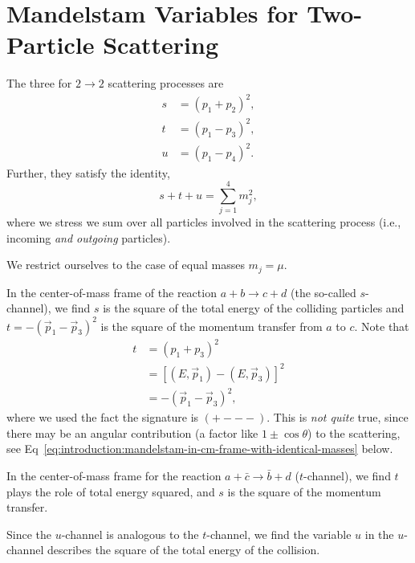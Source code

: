 \section{Mandelstam Variables for Two-Particle Scattering}

\begin{definition}
  The three  for $2\to2$ scattering
  processes are
  \begin{subequations}
    \begin{align}
      s &= (p_{1} + p_{2})^{2},\\
      t &= (p_{1} - p_{3})^{2},\\
      u &= (p_{1} - p_{4})^{2}.
    \end{align}
  \end{subequations}
  Further, they satisfy the identity,
  \begin{equation}
s + t + u = \sum^{4}_{j=1}m_{j}^{2},
  \end{equation}
  where we stress we sum over all particles involved in the scattering
  process (i.e., incoming \emph{and outgoing} particles).
\end{definition}

 We restrict ourselves to the case of equal masses
$m_{j}=\mu$.

 In the center-of-mass frame of the reaction $a+b\to c+d$
(the so-called $s$-channel), we find $s$ is the square of the total
energy of the colliding particles and $t=-(\vec{p}_{1}-\vec{p}_{3})^{2}$
is the square of the momentum transfer from $a$ to $c$. Note that
\begin{subequations}
  \begin{align}
    t &= (p_{1} + p_{3})^{2}\\
    &= [(E,\vec{p}_{1}) - (E,\vec{p}_{3})]^{2}\\
    &= -(\vec{p}_{1}-\vec{p}_{3})^{2},
  \end{align}
\end{subequations}
where we used the fact the signature is $(+---)$. This is \emph{not quite}
true, since there may be an angular contribution (a factor like
$1\pm\cos\theta$) to the scattering, see Eq~\eqref{eq:introduction:mandelstam-in-cm-frame-with-identical-masses}
below.

In the center-of-mass frame for the reaction $a+\bar{c}\to\bar{b}+d$
($t$-channel), we find $t$ plays the role of total energy squared, and
$s$ is the square of the momentum transfer.

Since the $u$-channel is analogous to the $t$-channel, we find the
variable $u$ in the $u$-channel describes the square of the total energy
of the collision.

